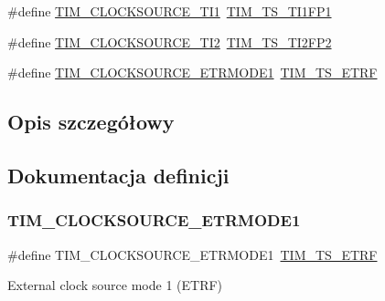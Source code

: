 \begin{DoxyCompactItemize}
\#define \hyperlink{group___t_i_m___clock___source_ga0a8708d4dab5cbd557a76efb362e13c0}{T\+I\+M\+\_\+\+C\+L\+O\+C\+K\+S\+O\+U\+R\+C\+E\+\_\+\+T\+I1}~\hyperlink{group___t_i_m___trigger___selection_ga38d3514d54bcdb0ea8ac8bd91c5832b5}{T\+I\+M\+\_\+\+T\+S\+\_\+\+T\+I1\+F\+P1}
\item 
\#define \hyperlink{group___t_i_m___clock___source_ga7950cf616702dd38d8f1ab5091efc012}{T\+I\+M\+\_\+\+C\+L\+O\+C\+K\+S\+O\+U\+R\+C\+E\+\_\+\+T\+I2}~\hyperlink{group___t_i_m___trigger___selection_ga0ed58a269bccd3f22d19cc9a2ba3123f}{T\+I\+M\+\_\+\+T\+S\+\_\+\+T\+I2\+F\+P2}
\item 
\#define \hyperlink{group___t_i_m___clock___source_gaa7743af6f4b8869cad0375526c6145ce}{T\+I\+M\+\_\+\+C\+L\+O\+C\+K\+S\+O\+U\+R\+C\+E\+\_\+\+E\+T\+R\+M\+O\+D\+E1}~\hyperlink{group___t_i_m___trigger___selection_gaece08e02e056613a882aa7ff0a6ccc2d}{T\+I\+M\+\_\+\+T\+S\+\_\+\+E\+T\+RF}
\end{DoxyCompactItemize}


\subsection{Opis szczegółowy}


\subsection{Dokumentacja definicji}
\mbox{\label{group___t_i_m___clock___source_gaa7743af6f4b8869cad0375526c6145ce}} 
\subsubsection{\texorpdfstring{T\+I\+M\+\_\+\+C\+L\+O\+C\+K\+S\+O\+U\+R\+C\+E\+\_\+\+E\+T\+R\+M\+O\+D\+E1}{TIM\_CLOCKSOURCE\_ETRMODE1}}
{\footnotesize\ttfamily \#define T\+I\+M\+\_\+\+C\+L\+O\+C\+K\+S\+O\+U\+R\+C\+E\+\_\+\+E\+T\+R\+M\+O\+D\+E1~\hyperlink{group___t_i_m___trigger___selection_gaece08e02e056613a882aa7ff0a6ccc2d}{T\+I\+M\+\_\+\+T\+S\+\_\+\+E\+T\+RF}}

External clock source mode 1 (E\+T\+RF) 

